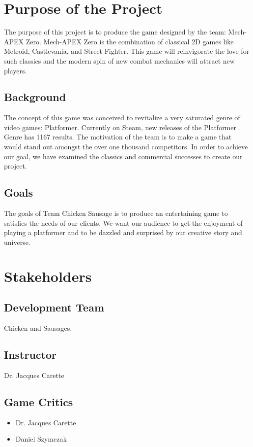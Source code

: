 \documentclass{article}
\begin{document}
\tableofcontents

\section{Purpose of the Project}
The purpose of this project is to produce the game designed by the team: Mech-APEX Zero. Mech-APEX Zero is the combination of classical 2D games like Metroid, Castlevania, and Street Fighter. This game will reinvigorate the love for such classics and the modern spin of new combat mechanics will attract new players.

\subsection{Background}
The concept of this game was conceived to revitalize a very saturated genre of video games: Platformer. Currently on Steam, new releases of the Platformer Genre has 1167 results. The motivation of the team is to make a game that would stand out amongst the over one thousand competitors. In order to achieve our goal, we have examined the classics and commercial successes to create our project.

\subsection{Goals}
The goals of Team Chicken Sausage is to produce an entertaining game to satisfies the needs of our clients. We want our audience to get the enjoyment of playing a platformer and to be dazzled and surprised by our creative story and universe.

\section{Stakeholders}
    \subsection{Development Team} Chicken and Sausages. 
    \subsection{Instructor} Dr. Jacques Carette  
    \subsection{Game Critics}
        \begin{itemize}
            \item Dr. Jacques Carette
            \item Daniel Szymczak
        \end{itemize}
\end{document}
